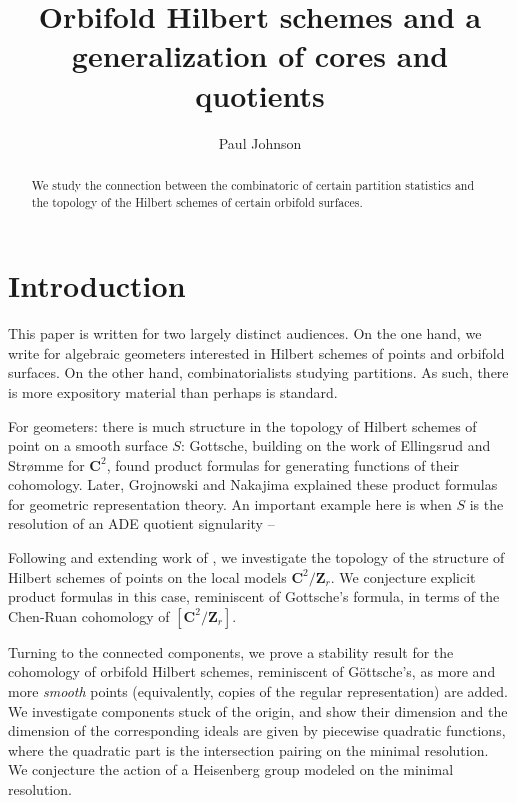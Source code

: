 \documentclass{amsart}[12pt]
\theoremstyle{definition}
\newcommand{\Z}{\mathbf{Z}}
\newcommand{\C}{\mathbf{C}}
\begin{document}
\begin{abstract}
We study the connection between the combinatoric of certain partition statistics and the topology of the Hilbert schemes of certain orbifold surfaces.
\end{abstract}


\title{Orbifold Hilbert schemes and a generalization of cores and quotients}


\author{Paul Johnson}
\address{University of Sheffield}


\maketitle
\setcounter{tocdepth}{2}
\tableofcontents
\section{Introduction}
\cite{GLMpower}

This paper is written for two largely distinct audiences.  On the one hand, we write for algebraic geometers interested in Hilbert schemes of points and orbifold surfaces.  On the other hand, combinatorialists studying partitions.  As such, there is more expository material than perhaps is standard. 

For geometers: there is much structure in the topology of Hilbert schemes of point on a smooth surface $S$: Gottsche, building on the work of Ellingsrud and Str\o mme for $\C^2$, found product formulas for generating functions of their cohomology.  Later, Grojnowski and Nakajima \cite{grojnowski, nakajimaheisenberg} explained these product formulas for geometric representation theory.  An important example here is when $S$ is the resolution of an ADE quotient signularity -- 

Following and extending work of , we investigate the topology of the structure of Hilbert schemes of points on the local models $\C^2/\Z_r$.  We conjecture explicit product formulas in this case, reminiscent of Gottsche's formula, in terms of the Chen-Ruan cohomology of $[\C^2/\Z_r]$.  

Turning to the connected components, we prove a stability result for the cohomology of orbifold Hilbert schemes, reminiscent of G\"ottsche's, as more and more \emph{smooth} points (equivalently, copies of the regular representation) are added.  We investigate components stuck of the origin, and show their dimension and the dimension of the corresponding ideals are given by piecewise quadratic functions, where the quadratic part is the intersection pairing on the minimal resolution.  We conjecture the action of a Heisenberg group modeled on the minimal resolution.
\end{document}
